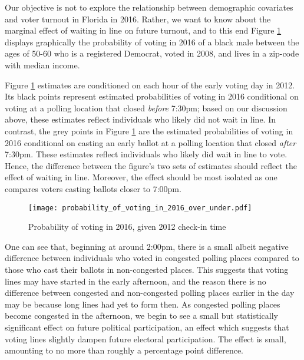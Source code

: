 \documentclass[12pt,titlepage]{article}
\begin{document}
Our objective is not to explore the relationship between demographic
covariates and voter turnout in Florida in 2016.  Rather, we want to
know about the marginal effect of waiting in line on future turnout,
and to this end Figure \ref{fig:prvoting2016} displays graphically the
probability of voting in 2016 of a black male between the ages of
50-60 who is a registered Democrat, voted in 2008, and lives in a
zip-code with median income.  %

Figure \ref{fig:prvoting2016} estimates are conditioned on each hour
of the early voting day in 2012. Its black points represent estimated
probabilities of voting in 2016 conditional on voting at a polling
location that closed \emph{before} 7:30pm; based on our discussion
above, these estimates reflect individuals who likely did not wait in
line.  In contrast, the grey points in Figure \ref{fig:prvoting2016}
are the estimated probabilities of voting in 2016 conditional on
casting an early ballot at a polling location that closed \emph{after}
7:30pm.  These estimates reflect individuals who likely did wait in
line to vote.  Hence, the difference between the figure's two sets of
estimates should reflect the effect of waiting in line.  Moreover, the
effect should be most isolated as one compares voters casting ballots
closer to 7:00pm.

\begin{figure}[!ht]
\caption{Probability of voting in 2016, given 2012 check-in time}
  \label{fig:prvoting2016}
  \centering
    \centering\texttt{[image: probability\_of\_voting\_in\_2016\_over\_under.pdf]}
\end{figure}

One can see that, beginning at around 2:00pm, there is a small albeit
negative difference between individuals who voted in congested polling
places compared to those who cast their ballots in non-congested
places.  This suggests that voting lines may have started in the early
afternoon, and the reason there is no difference between congested and
non-congested polling places earlier in the day may be because long
lines had yet to form then. As congested polling places become
congested in the afternoon, we begin to see a small but statistically
significant effect on future political participation, an effect which
suggests that voting lines slightly dampen future electoral
participation.  The effect is small, amounting to no more than roughly
a percentage point difference.
\end{document}
